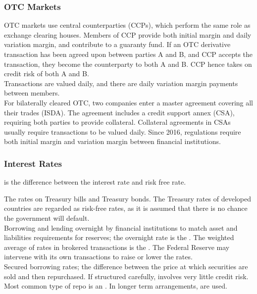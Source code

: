 \subsubsection{OTC Markets}

OTC markets use central counterparties (CCPs), which perform the same role as exchange clearing houses. Members of CCP provide both initial margin and daily variation margin, and contribute to a guaranty fund. If an OTC derivative transaction has been agreed upon between parties A and B, and CCP accepts the transaction, they become the counterparty to both A and B. CCP hence takes on credit risk of both A and B.\\
Transactions are valued daily, and there are daily variation margin payments between members.\\

For bilaterally cleared OTC, two companies enter a master agreement covering all their trades (ISDA). The agreement includes a credit support annex (CSA), requiring both parties to provide collateral. Collateral agreements in CSAs usually require transactions to be valued daily. Since 2016, regulations require both initial margin and variation margin between financial institutions.

\subsubsection{Interest Rates}

\begin{definition}  is the difference between the interest rate and risk free rate.
\end{definition}

 The rates on Treasury bills and Treasury bonds. The Treasury rates of developed countries are regarded as risk-free rates, as it is assumed that there is no chance the government will default.\\

 Borrowing and lending overnight by financial institutions to match asset and liabilities requirements for reserves; the overnight rate is the . The weighted average of rates in brokered transactions is the . The Federal Reserve may intervene with its own transactions to raise or lower the rates.\\

 Secured borrowing rates; the difference between the price at which securities are sold and then repurchased. If structured carefully, involves very little credit risk. Most common type of repo is an . In longer term arrangements,  are used.\\

